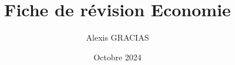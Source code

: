 \documentclass[30pt, french]{report}
\title{\Huge Fiche de révision Economie}
\author{\LARGE Alexis GRACIAS}
\date{\Large Octobre 2024}
\begin{document}
\maketitle
\Large \tableofcontents








\listoftables
\end{document}
